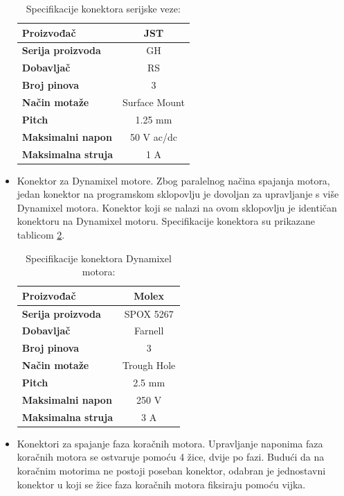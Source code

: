 \documentclass[11pt,a4paper]{article}
\begin{document}
\begin{center}
\begin{itemize}
\begin{table}[H]
	\centering
	\caption{Specifikacije konektora serijske veze: }
	\label{tab:specifikacija_connector_serial}
	\begin{tabular}{|l|c|}
		\hline
		\textbf{Proizvođač} & JST \\ \hline 
		\textbf{Serija proizvoda} & GH \\ \hline 
		\textbf{Dobavljač} & RS \\ \hline 
		\textbf{Broj pinova} & 3 \\ \hline 
		\textbf{Način motaže} & Surface Mount    \\ \hline
		\textbf{Pitch} & 1.25 mm    \\ \hline 
		\textbf{Maksimalni napon} & 50 V  ac/dc\\ \hline 
		\textbf{Maksimalna struja} & 1 A \\ \hline
	\end{tabular}
\end{table}		

		
		\item Konektor za Dynamixel motore. Zbog paralelnog načina spajanja motora, jedan konektor na programskom sklopovlju je dovoljan za upravljanje s više Dynamixel motora. Konektor koji se nalazi na ovom sklopovlju je identičan konektoru na Dynamixel motoru. Specifikacije konektora su prikazane tablicom \ref{tab:specifikacija_connector_dynamixel}.
		
\begin{table}[H]
	\centering
	\caption{Specifikacije konektora Dynamixel motora: }
	\label{tab:specifikacija_connector_dynamixel}
	\begin{tabular}{|l|c|}
		\hline
		\textbf{Proizvođač} & Molex \\ \hline 
		\textbf{Serija proizvoda} & SPOX 5267 \\ \hline 
		\textbf{Dobavljač} & Farnell \\ \hline 
		\textbf{Broj pinova} & 3 \\ \hline 
		\textbf{Način motaže} & Trough Hole    \\ \hline
		\textbf{Pitch} & 2.5 mm    \\ \hline 
		\textbf{Maksimalni napon} & 250 V \\ \hline 
		\textbf{Maksimalna struja} & 3 A \\ \hline
	\end{tabular}
\end{table}
		
		\item Konektori za spajanje faza koračnih motora. Upravljanje naponima faza koračnih motora se ostvaruje pomoću 4 žice, dvije po fazi. Budući da na koračnim motorima ne postoji poseban konektor, odabran je jednostavni konektor u koji se žice faza koračnih motora fiksiraju pomoću vijka.
		

\end{itemize}
\end{center}
\end{document}
